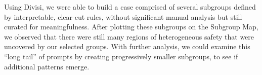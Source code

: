 Using Divisi, we were able to build a case comprised of several subgroups defined by interpretable, clear-cut rules, without significant manual analysis but still curated for meaningfulness.
After plotting these subgroups on the Subgroup Map, we observed that there were still many regions of heterogeneous safety that were uncovered by our selected groups.
With further analysis, we could examine this ``long tail'' of prompts by creating progressively smaller subgroups, to see if additional patterns emerge.